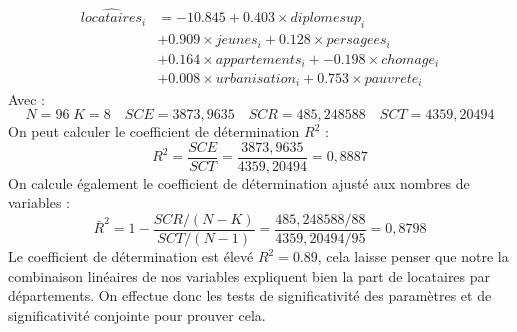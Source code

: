 \documentclass[]{article}
\begin{document}
\begin{equation*}
    \begin{split}
            \hat{locataires}_i &= -10.845 + 0.403 \times diplomesup_i \\
            &+ 0.909 \times jeunes_i + 0.128 \times persagees_i \\
            &+ 0.164 \times appartements_i + -0.198 \times chomage_i \\
            &+ 0.008 \times urbanisation_i + 0.753 \times pauvrete_i
    \end{split}
\end{equation*}
Avec : 
\begin{equation*}
    N = 96 \; K = 8 \quad  SCE = 3873,9635 \quad SCR = 485,248588 \quad SCT = 4359,20494
\end{equation*}
On peut calculer le coefficient de détermination $R^{2}$ :
\begin{equation*}
    R^{2} = \frac{SCE}{SCT} = \frac{3873,9635}{4359,20494} = 0,8887
\end{equation*}
On calcule également le coefficient de détermination ajusté aux nombres de variables :
\begin{equation*}
    \bar{R}^{2} = 1 - \frac{SCR/(N-K)}{SCT/(N-1)} = \frac{485,248588/88}{4359,20494/95} = 0,8798
\end{equation*}
Le coefficient de détermination est élevé $R^{2} = 0.89$, cela laisse penser que notre la combinaison linéaires de nos variables expliquent bien la part de locataires par
départements. On effectue donc les tests de significativité des paramètres et de significativité conjointe pour prouver cela.
\end{document}
